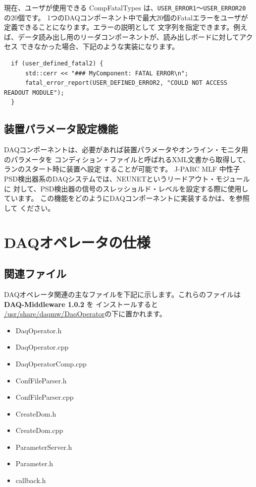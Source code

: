 \documentclass[a4j,10pt,dvips,onecolumn,oneside,final]{jarticle}%
\newcommand {\daqmwcurrent} {
	{\bf DAQ-Middleware 1.0.2}
}
\begin{document}
現在、ユーザが使用できる CompFatalTypes は、\verb|USER_ERROR1|〜\verb|USER_ERROR20| の20個です。
1つのDAQコンポーネント中で最大20個のFatalエラーをユーザが定義できることになります。エラーの説明として
文字列を指定できます。例えば、データ読み出し用のリーダコンポーネントが、読み出しボードに対してアクセス
できなかった場合、下記のような実装になります。
\begin{Verbatim}
  if (user_defined_fatal2) {
      std::cerr << "### MyComponent: FATAL ERROR\n";
      fatal_error_report(USER_DEFINED_ERROR2, "COULD NOT ACCESS READOUT MODULE");
  }
\end{Verbatim}

\subsection{装置パラメータ設定機能}\label{comp-cond}
DAQコンポーネントは、必要があれば装置パラメータやオンライン・モニタ用のパラメータを
コンディション・ファイルと呼ばれるXML文書から取得して、ランのスタート時に装置へ設定
することが可能です。
J-PARC MLF 中性子PSD検出器系のDAQシステムでは、NEUNETというリードアウト・モジュールに
対して、PSD検出器の信号のスレッショルド・レベルを設定する際に使用しています。
この機能をどのようにDAQコンポーネントに実装するかは、\cite{Cond-manual}を参照して
ください。

\section{DAQオペレータの仕様}\label{daqop}
\subsection{関連ファイル}

DAQオペレータ関連の主なファイルを下記に示します。これらのファイルは\daqmwcurrent を
インストールすると \url{/usr/share/daqmw/DaqOperator}の下に置かれます。
\begin{itemize}
\item DaqOperator.h
\item DaqOperator.cpp
\item DaqOperatorComp.cpp
\item ConfFileParser.h
\item ConfFileParser.cpp
\item CreateDom.h
\item CreateDom.cpp
\item ParameterServer.h
\item Parameter.h
\item callback.h
\end{itemize}
\end{document}
